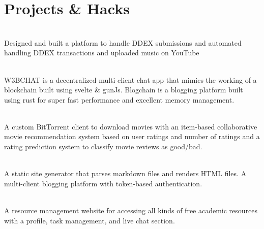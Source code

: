 \documentclass[]{assets/deedy-resume-openfont}
\begin{document}
\section{Projects \& Hacks}
\raggedright
{}
\descript{} \hfill {}\\
Designed and built a platform to handle DDEX submissions and automated handling DDEX transactions and uploaded music on YouTube
\sectionsep

 \hfill {}\\
W3BCHAT is a decentralized multi-client chat app that mimics the working of a blockchain built using svelte \& gunJs. Blogchain is a blogging platform built using rust for super fast performance and excellent memory management.\\
\sectionsep

\hfill {}\\
A custom BitTorrent client to download movies with an item-based collaborative movie recommendation system based on user ratings and number of ratings and a rating prediction system to classify movie reviews as good/bad.\\
\sectionsep


\hfill {}\\
A static site generator that parses markdown files and renders HTML files. A multi-client blogging platform with token-based authentication. \\
\sectionsep


\hfill {}\\
A resource management website for accessing all kinds of free academic resources with a profile, task management, and live chat section.\\
\end{document}
